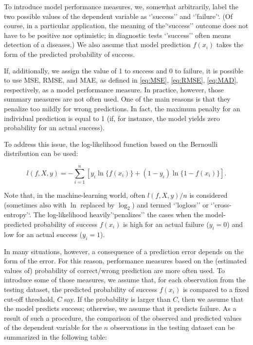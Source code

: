 \documentclass[]{krantz}
\begin{document}
To introduce model performance measures, we, somewhat arbitrarily, label the two possible values of the dependent variable as `'success'' and `'failure'`. (Of course, in a particular application, the meaning of the'`success'' outcome does not have to be positive nor optimistic; in diagnostic tests `'success'' often means detection of a diseases.) We also assume that model prediction \(f(x_i)\) takes the form of the predicted probability of success.

If, additionally, we assign the value of 1 to success and 0 to failure, it is possible to use MSE, RMSE, and MAE, as defined in \eqref{eq:MSE}, \eqref{eq:RMSE}, \eqref{eq:MAD}, respectively, as a model performance measure. In practice, however, those summary measures are not often used. One of the main reasons is that they penalize too mildly for wrong predictions. In fact, the maximum penalty for an individual prediction is equal to 1 (if, for instance, the model yields zero probability for an actual success).

To address this issue, the log-likelihood function based on the Bernoulli distribution can be used:

\begin{equation}
l(f, X ,y) =  -\sum_{i=1}^{n} [y_i \ln\{f(x_i)\}+ (1-y_i) \ln\{1-f(x_i)\}].
\label{eq:bernoulli}
\end{equation}

Note that, in the machine-learning world, often \(l(f, X ,y)/n\) is considered (sometimes also with \(\ln\) replaced by \(\log_2\)) and termed `'logloss'' or `'cross-entropy'`. The log-likelihood heavily'`penalizes'' the cases when the model-predicted probability of success \(f(x_i)\) is high for an actual failure (\(y_i=0\)) and low for an actual success (\(y_i=1\)).

In many situations, however, a consequence of a prediction error depends on the form of the error. For this reason, performance measures based on the (estimated values of) probability of correct/wrong prediction are more often used. To introduce some of those measures, we assume that, for each observation from the testing dataset, the predicted probability of success \(f(x_i)\) is compared to a fixed cut-off threshold, \(C\) say. If the probability is larger than \(C\), then we assume that the model predicts success; otherwise, we assume that it predicts failure. As a result of such a procedure, the comparison of the observed and predicted values of the dependent variable for the \(n\) observations in the testing dataset can be summarized in the following table:
\end{document}
